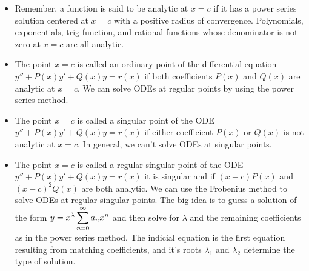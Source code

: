 \begin{itemize}
	\item 
Remember, a function is said to be analytic at $x=c$ if it has a power series solution centered at $x=c$ with a positive radius of convergence.  Polynomials, exponentials, trig function, and rational functions whose denominator is not zero at $x=c$ are all analytic.
\item
The point $x=c$ is called an ordinary point of the differential equation $y''+P(x) y' +Q(x) y =r(x)$ if both coefficients $P(x)$ and $Q(x)$ are analytic at $x=c$. We can solve ODEs at regular points by using the power series method.
\item The point $x=c$ is called a singular point of the ODE $y''+P(x) y' +Q(x) y =r(x)$ if either coefficient $P(x)$ or $Q(x)$ is not analytic at $x=c$. In general, we can't solve ODEs at singular points.
\item The point $x=c$ is called a regular singular point of the ODE $y''+P(x) y' +Q(x) y =r(x)$  it is singular and if $(x-c)P(x)$ and $(x-c)^2Q(x)$ are both analytic. We can use the Frobenius method to solve ODEs at regular singular points. The big idea is to guess a solution of the form $\displaystyle y = x^\lambda \sum_{n=0}^\infty a_n x^n$ and then solve for $\lambda$ and the remaining coefficients as in the power series method.  The indicial equation is the first equation resulting from matching coefficients, and it's roots $\lambda_1$ and $\lambda_2$ determine the type of solution.
\end{itemize}

